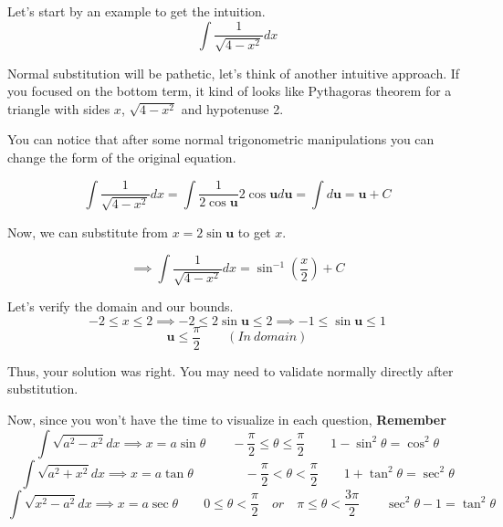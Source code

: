 \documentclass{article}
\begin{document}
	Let's start by an example to get the intuition. 
	\[
		\int \frac{1}{ \sqrt{ 4-x^2 } } dx 
	\]

	Normal substitution will be pathetic, let's think of another intuitive approach. If you focused on the bottom term, it kind of looks like Pythagoras theorem for a triangle with sides $ x $, $ \sqrt{ 4-x^2 } $ and hypotenuse 2.
	\begin{center}


	\end{center}

	You can notice that after some normal trigonometric manipulations you can change the form of the original equation.

	\[
		\int \frac{1}{ \sqrt{ 4-x^2 } } dx = \int \frac{1}{2 \cos \textbf{u} }   2 \cos{ \textbf{u} } d \textbf{u} = \int	d \textbf{u} = \textbf{u} + C  
	\]

	Now, we can substitute from $ x = 2 \sin{ \textbf{u}  }  $ to get $ x $. 

	\[
		\implies 	\int \frac{1}{ \sqrt{ 4-x^2 } } dx = \sin^{-1} (\frac{x}{2}) + C
	\]

	Let's verify the domain and our bounds.
	\[
		-2 \leq x \leq 2 \implies
		-2 \leq 2 \sin{ \textbf{u}  } \leq 2 \implies
		-1 \leq \sin{ \textbf{u}  } \leq 1
	\]
	\[
		\textbf{u} \leq \frac{\pi}{2} \qquad (In\ domain)
	\]

	Thus, your solution was right. You may need to validate normally directly after substitution.

	Now, since you won't have the time to visualize in each question, \textbf{Remember }
	\[
		\int \sqrt{ a^2-x^2 } dx \implies x = a \sin{ \theta } \qquad -\frac{\pi}{2} \leq \theta \leq \frac{\pi}{2} \qquad 1 - \sin^2{ \theta }  = \cos^2{\theta} 
	\]
	\[
		\int \sqrt{ a^2+x^2 } dx \implies x = a \tan{ \theta } 
		\qquad \qquad   -\frac{\pi}{2} < \theta < \frac{\pi}{2} \qquad 1 + \tan^2{\theta} = \sec^2{\theta} 
	\]
	\[
		\int \sqrt{ x^2-a^2 } dx \implies x = a \sec{\theta}
		\qquad 0 \leq \theta < \frac{\pi}{2} \quad or \quad \pi \leq \theta < \frac{3\pi}{2} 
		\qquad \sec^2{\theta} - 1 = \tan^2{\theta}
	\]


	\newpage
\end{document}
